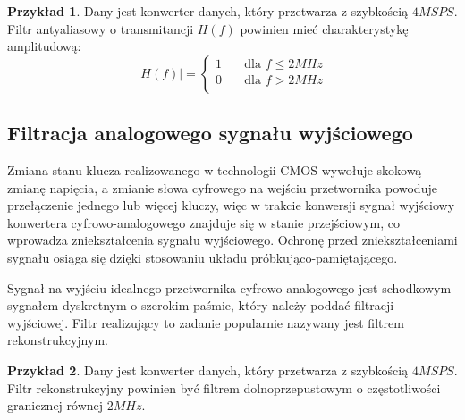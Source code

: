 \documentclass[10pt,a4paper,twoside]{report}
\theoremstyle{definition}
\theoremstyle{definition}
\theoremstyle{definition}
\newtheorem{przyklad}{Przykład}[section]
\theoremstyle{definition}
\theoremstyle{definition}
\begin{document}
	\begin{przyklad}{Dany jest konwerter danych, który przetwarza z szybkością $4MSPS$. Filtr antyaliasowy o transmitancji $H(f)$ powinien mieć charakterystykę amplitudową:}
		\[   
		|H(f)| = 
		\begin{cases}
			1 &\quad \text{dla } f \le 2MHz\\
			0 &\quad \text{dla } f>2MHz\\
		\end{cases}
		\]		
	\end{przyklad}

	\subsection{Filtracja analogowego sygnału wyjściowego}
	{	Zmiana stanu klucza realizowanego w technologii CMOS wywołuje skokową zmianę napięcia, a zmianie słowa cyfrowego na wejściu przetwornika powoduje przełączenie jednego lub więcej kluczy, więc w trakcie konwersji sygnał wyjściowy konwertera cyfrowo-analogowego znajduje się w stanie przejściowym, co wprowadza zniekształcenia sygnału wyjściowego. Ochronę przed zniekształceniami sygnału osiąga się dzięki stosowaniu układu próbkująco-pamiętającego.}
	
	{	Sygnał na wyjściu idealnego przetwornika cyfrowo-analogowego jest schodkowym sygnałem dyskretnym o szerokim paśmie, który należy poddać filtracji wyjściowej. Filtr realizujący to zadanie popularnie nazywany jest filtrem rekonstrukcyjnym. }
	

	\begin{przyklad}{Dany jest konwerter danych, który przetwarza z szybkością $4MSPS$. Filtr rekonstrukcyjny powinien być filtrem dolnoprzepustowym o częstotliwości granicznej równej $2MHz$.}
	\end{przyklad}
\end{document}
